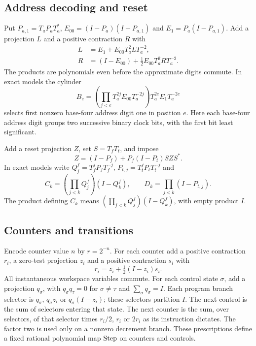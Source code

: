 \subsection{Address decoding and reset}
Put $P_{a,1}=T_aP_aT_a^*$, $E_{00}=(I-P_a)(I-P_{a,1})$ and $E_1=P_a(I-P_{a,1})$. Add a projection $L$ and a positive contraction $R$ with
\begin{align}
 L&=E_1+E_{00}T_a^2LT_a^{-2},\label{eq:decode-L}\\
 R&=(I-E_{00})+\tfrac12E_{00}T_a^2RT_a^{-2}.\label{eq:decode-R}
\end{align}
The products are polynomials even before the approximate digits commute. In exact models the cylinder
\begin{equation}\label{eq:address-cyl}
 B_e=\left(\prod_{j<e}T_a^{2j}E_{00}T_a^{-2j}\right)
       T_a^{2e}E_1T_a^{-2e}
\end{equation}
selects first nonzero base-four address digit one in position $e$.
Here each base-four address digit groups two successive binary clock bits, with the first bit least significant.

Add a reset projection $Z$, set $S=T_fT_t$, and impose
\begin{equation}\label{eq:reset}
 Z=(I-P_f)+P_f(I-P_t)SZS^*.
\end{equation}
In exact models write $Q_j^{f}=T_f^jP_fT_f^{-j}$, $P_{t,j}=T_t^jP_tT_t^{-j}$ and
\begin{equation}\label{eq:fuel-cyl}
 C_k=\left(\prod_{j<k}Q_j^{f}\right)(I-Q_k^{f}),\qquad
 D_k=\prod_{j<k}(I-P_{t,j}).
\end{equation}
The product defining $C_k$ means $(\prod_{j<k}Q_j^f)(I-Q_k^f)$, with empty product $I$.

\subsection{Counters and transitions}
Encode counter value $n$ by $r=2^{-n}$. For each counter add a positive contraction $r_i$, a zero-test projection $z_i$ and a positive contraction $s_i$ with
\begin{equation}\label{eq:zero-test}
 r_i=z_i+\tfrac12(I-z_i)s_i.
\end{equation}
All instantaneous workspace variables commute. For each control state $\sigma$, add a projection $q_\sigma$, with $q_\sigma q_\tau=0$ for $\sigma\ne\tau$ and $\sum_\sigma q_\sigma=I$. Each program branch selector is $q_\sigma$, $q_\sigma z_i$ or $q_\sigma(I-z_i)$; these selectors partition $I$. The next control is the sum of selectors entering that state. The next counter is the sum, over selectors, of that selector times $r_i/2$, $r_i$ or $2r_i$ as its instruction dictates. The factor two is used only on a nonzero decrement branch. These prescriptions define a fixed rational polynomial map $\operatorname{Step}$ on counters and controls.


